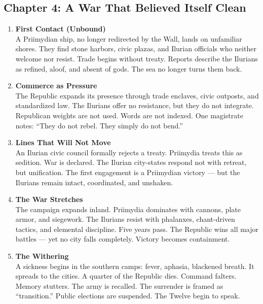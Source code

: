 \documentclass[9pt]{article}
\begin{document}
\newpage

\subsection*{Chapter 4: A War That Believed Itself Clean}

\vspace{1in}

\begin{center}
\begin{enumerate}
    \item \textbf{First Contact (Unbound)} \\
    A Priimydian ship, no longer redirected by the Wall, lands on unfamiliar shores. They find stone harbors, civic plazas, and Ilurian officials who neither welcome nor resist. Trade begins without treaty. Reports describe the Ilurians as refined, aloof, and absent of gods. The sea no longer turns them back.

    \vspace{.3in}
    \item \textbf{Commerce as Pressure} \\
    The Republic expands its presence through trade enclaves, civic outposts, and standardized law. The Ilurians offer no resistance, but they do not integrate. Republican weights are not used. Words are not indexed. One magistrate notes: “They do not rebel. They simply do not bend.”

    \vspace{.3in}
    \item \textbf{Lines That Will Not Move} \\
    An Ilurian civic council formally rejects a treaty. Priimydia treats this as sedition. War is declared. The Ilurian city-states respond not with retreat, but unification. The first engagement is a Priimydian victory — but the Ilurians remain intact, coordinated, and unshaken.

    \vspace{.3in}
    \item \textbf{The War Stretches} \\
    The campaign expands inland. Priimydia dominates with cannons, plate armor, and siegework. The Ilurians resist with phalanxes, chant-driven tactics, and elemental discipline. Five years pass. The Republic wins all major battles — yet no city falls completely. Victory becomes containment.

    \vspace{.3in}
    \item \textbf{The Withering} \\
    A sickness begins in the southern camps: fever, aphasia, blackened breath. It spreads to the cities. A quarter of the Republic dies. Command falters. Memory stutters. The army is recalled. The surrender is framed as “transition.” Public elections are suspended. The Twelve begin to speak.
\end{enumerate}
\end{center}
\end{document}

